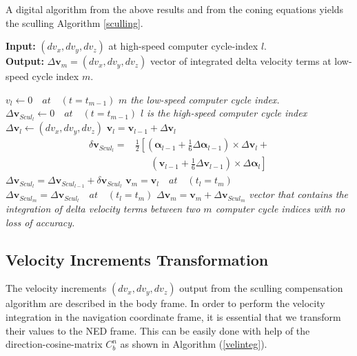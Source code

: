 \documentclass[journal]{IEEEtran}
\begin{document}
A digital algorithm from the above results and from the coning equations yields the  sculling Algorithm \ref{sculling}.


\begin{algorithm}[h]
\caption{Sculling algorithm}\label{sculling}
 \hspace*{\algorithmicindent} \textbf{Input:} $(dv_x, dv_y,dv_z)$ at high-speed computer cycle-index $l$.\\
 \hspace*{\algorithmicindent} \textbf{Output:} $\Delta\boldsymbol{v}_m=(dv_x, dv_y,dv_z)$ vector of integrated delta velocity terms at low-speed cycle index $m$.
\begin{algorithmic}[1]
\State ${v}_l \gets 0\quad at\quad (t=t_{m-1})$ \Comment \textit{$m$ the low-speed computer cycle index.}
\State $\Delta\boldsymbol{v}_{Scul_l} \gets 0\quad at\quad (t=t_{m-1})$
\Comment \textit{$l$ is the high-speed computer cycle index}
\State $\Delta\boldsymbol{v}_l \gets (dv_x, dv_y,dv_z)$
\State $\boldsymbol{v}_l = \boldsymbol{v}_{l-1}+\Delta\boldsymbol{v}_l$
\State \begin{equation}\begin{split}
\delta\boldsymbol{v}_{Scul_l}=&\frac{1}{2}\left[\left(\boldsymbol{\alpha}_{l-1}+\frac{1}{6}\Delta\boldsymbol{\alpha}_{l-1}\right)\times \Delta\boldsymbol{v}_l +\right. \\
&\left. \phantom{=[}\left(\boldsymbol{v}_{l-1}+\frac{1}{6}\Delta\boldsymbol{v}_{l-1}\right)\times \Delta\boldsymbol{\alpha}_l \right]\end{split}\end{equation} 
\State $\Delta\boldsymbol{v}_{Scul_l}=\Delta\boldsymbol{v}_{Scul_{l-1}} + 
\delta\boldsymbol{v}_{Scul_l} $
\EndWhile
\State $\boldsymbol{v}_m = \boldsymbol{v}_l\quad at\quad (t_l=t_m)$
\State $\Delta\boldsymbol{v}_{Scul_m}= \Delta\boldsymbol{v}_{Scul_{l}}\quad at\quad (t_l=t_m) $
\State $\Delta\boldsymbol{v}_m  =  \boldsymbol{v}_m + \Delta\boldsymbol{v}_{Scul_m} $ \Comment  \textit{vector that contains the integration of delta velocity terms between two $m$ computer cycle indices with no loss of accuracy.} 
\end{algorithmic}
\end{algorithm}



%
\subsection{Velocity Increments Transformation}
The velocity increments $(dv_x, dv_y,dv_z)$ output from the sculling compensation algorithm are described in the body frame. In order to perform the velocity integration in the navigation coordinate frame, it is essential that we transform their values to the NED frame. This can be easily done with help of the direction-cosine-matrix $C_b^n$ as shown in Algorithm (\ref{velinteg}).
\end{document}
